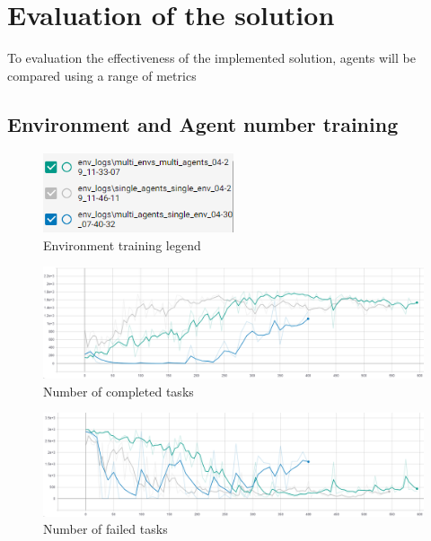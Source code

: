 \chapter{Evaluation of the solution}\label{ch:evaluation-of-the-solution}
To evaluation the effectiveness of the implemented solution, agents will be compared using a
range of metrics


\section{Environment and Agent number training}\label{sec:environment-training}

\begin{figure}
    \includegraphics[width=0.5\textwidth]{figures/env_training_fig/legend.png}
    \caption{Environment training legend}
    \label{fig:env-training-legend}
\end{figure}

\begin{figure}[h]
    \centering
    \includegraphics[width=15cm]{figures/env_training_fig/num_completed_tasks.PNG}
    \caption{Number of completed tasks}
    \label{fig:env_num_completed_tasks}
\end{figure}

\begin{figure}[h]
    \centering
    \includegraphics[width=15cm]{figures/env_training_fig/num_failed_tasks.png}
    \caption{Number of failed tasks}
    \label{fig:env_num_failed_tasks}
\end{figure}

